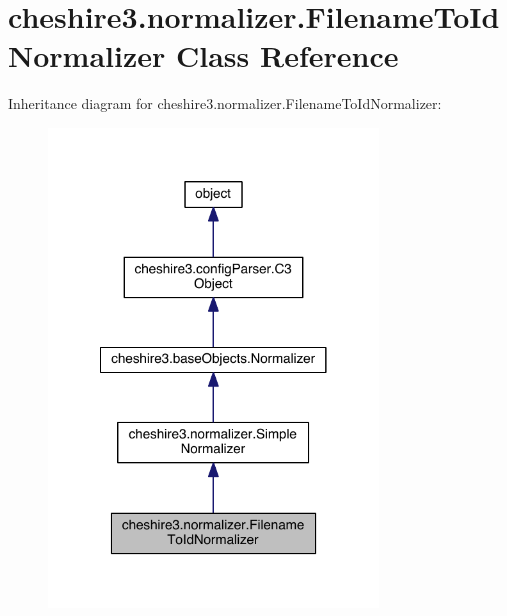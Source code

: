 \hypertarget{classcheshire3_1_1normalizer_1_1_filename_to_id_normalizer}{\section{cheshire3.\-normalizer.\-Filename\-To\-Id\-Normalizer Class Reference}
\label{classcheshire3_1_1normalizer_1_1_filename_to_id_normalizer}
}


Inheritance diagram for cheshire3.\-normalizer.\-Filename\-To\-Id\-Normalizer\-:
\nopagebreak
\begin{figure}[H]
\begin{center}
\leavevmode
\includegraphics[width=248pt]{classcheshire3_1_1normalizer_1_1_filename_to_id_normalizer__inherit__graph}
\end{center}
\end{figure}


